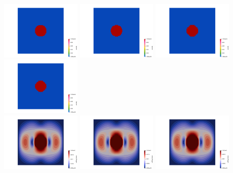 \begin{center}
\includegraphics[width=3.84cm]{python_codes/fieldstone_78/results/sphere/eta0}
\includegraphics[width=3.84cm]{python_codes/fieldstone_78/results/sphere/eta1}
\includegraphics[width=3.84cm]{python_codes/fieldstone_78/results/sphere/eta2}
\includegraphics[width=3.84cm]{python_codes/fieldstone_78/results/sphere/eta3}\\
\includegraphics[width=3.84cm]{python_codes/fieldstone_78/results/sphere/vel0}
\includegraphics[width=3.84cm]{python_codes/fieldstone_78/results/sphere/vel1}
\includegraphics[width=3.84cm]{python_codes/fieldstone_78/results/sphere/vel2}

\end{center}

